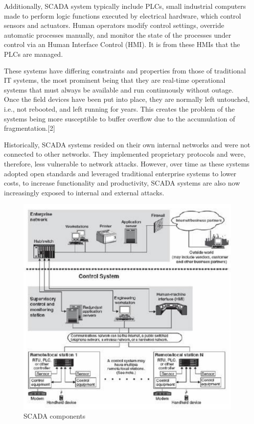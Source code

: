 \documentclass[11pt,]{article}
\begin{document}
Additionally, SCADA system typically include PLCs, small industrial
computers made to perform logic functions executed by electrical
hardware, which control sensors and actuators. Human operators modify
control settings, override automatic processes manually, and monitor the
state of the processes under control via an Human Interface Control
(HMI). It is from these HMIs that the PLCs are managed.

These systems have differing constraints and properties from those of
traditional IT systems, the most prominent being that they are real-time
operational systems that must always be available and run continuously
without outage. Once the field devices have been put into place, they
are normally left untouched, i.e., not rebooted, and left running for
years. This creates the problem of the systems being more susceptible to
buffer overflow due to the accumulation of fragmentation.{[}2{]}

Historically, SCADA systems resided on their own internal networks and
were not connected to other networks. They implemented proprietary
protocols and were, therefore, less vulnerable to network attacks.
However, over time as these systems adopted open standards and leveraged
traditional enterprise systems to lower costs, to increase functionality
and productivity, SCADA systems are also now increasingly exposed to
internal and external attacks.

\begin{figure}

{\centering \includegraphics{thesis_files/figure-latex/unnamed-chunk-4-1} 

}

\caption{SCADA components}\label{fig:unnamed-chunk-4}
\end{figure}
\end{document}
